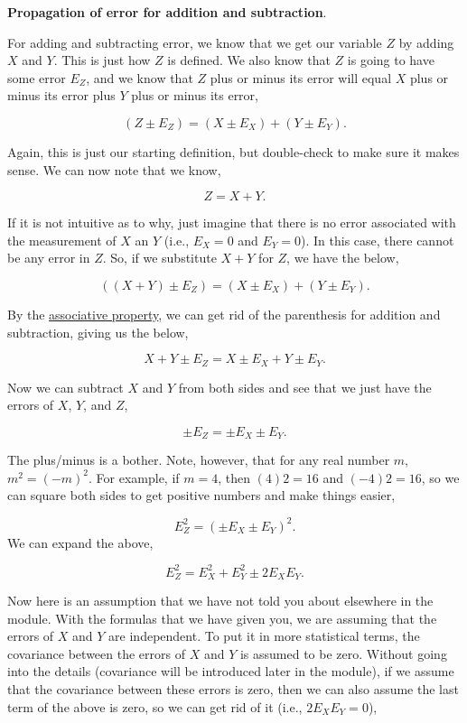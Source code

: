 \documentclass[
]{scrbook}
\begin{document}
\textbf{Propagation of error for addition and subtraction}.

For adding and subtracting error, we know that we get our variable \(Z\) by adding \(X\) and \(Y\). This is just how \(Z\) is defined. We also know that \(Z\) is going to have some error \(E_Z\), and we know that \(Z\) plus or minus its error will equal \(X\) plus or minus its error plus \(Y\) plus or minus its error,

\[(Z \pm E_Z) = (X  \pm E_X) + (Y \pm E_Y).\]

Again, this is just our starting definition, but double-check to make sure it makes sense. We can now note that we know,

\[Z =X+Y.\]

If it is not intuitive as to why, just imagine that there is no error associated with the measurement of \(X\) an \(Y\) (i.e., \(E_{X} = 0\) and \(E_{Y} = 0\)).
In this case, there cannot be any error in \(Z\). So, if we substitute \(X + Y\) for \(Z\), we have the below,

\[((X + Y) \pm E_Z) = (X  \pm E_X) + (Y \pm E_Y).\]

By the \href{https://en.wikipedia.org/wiki/Associative_property}{associative property}, we can get rid of the parenthesis for addition and subtraction, giving us the below,

\[X + Y \pm E_Z = X  \pm E_X + Y \pm E_Y.\]

Now we can subtract \(X\) and \(Y\) from both sides and see that we just have the errors of \(X\), \(Y\), and \(Z\),

\[\pm E_Z = \pm E_X \pm E_Y.\]

The plus/minus is a bother. Note, however, that for any real number \(m\), \(m^{2} = (-m)^2\). For example, if \(m = 4\), then \((4)2 = 16\) and \((-4)2 = 16\), so we can square both sides to get positive numbers and make things easier,

\[E_Z^2 = (\pm E_X \pm E_Y)^2.\]
We can expand the above,

\[E_Z^2 = E_X^2 + E_Y^2 \pm2E_X E_Y.\]

Now here is an assumption that we have not told you about elsewhere in the module.
With the formulas that we have given you, we are assuming that the errors of \(X\) and \(Y\) are independent.
To put it in more statistical terms, the covariance between the errors of \(X\) and \(Y\) is assumed to be zero.
Without going into the details (covariance will be introduced later in the module), if we assume that the covariance between these errors is zero, then we can also assume the last term of the above is zero, so we can get rid of it (i.e., \(2E_{X}E_{Y} = 0\)),
\end{document}
